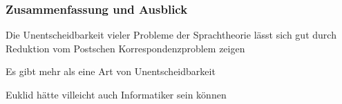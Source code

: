 \documentclass[onlymath]{beamer}
\begin{document}
\begin{frame}\frametitle{Zusammenfassung und Ausblick}

Die Unentscheidbarkeit vieler Probleme der Sprachtheorie lässt sich gut durch Reduktion vom Postschen Korrespondenzproblem zeigen\bigskip

Es gibt mehr als eine Art von Unentscheidbarkeit\bigskip

Euklid hätte villeicht auch Informatiker sein können\bigskip


\end{frame}

% 
% 
% 
% 
% 
% 
\end{document}
